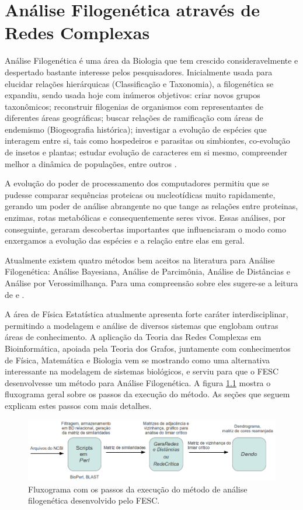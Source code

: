 \chapter{Análise Filogenética através de Redes Complexas} \label{cap:analisefilo}

Análise Filogenética é uma área da Biologia que tem crescido consideravelmente e despertado bastante interesse pelos pesquisadores. Inicialmente usada para
elucidar relações hierárquicas (Classificação e Taxonomia), a filogenética se expandiu, sendo usada hoje com inúmeros objetivos: criar novos grupos
taxonômicos; reconstruir filogenias de organismos com representantes de diferentes áreas geográficas; buscar
relações de ramificação com áreas de endemismo (Biogeografia histórica); investigar a evolução de espécies que interagem entre si, tais como hospedeiros
e parasitas ou simbiontes, co-evolução de insetos e plantas; estudar evolução de caracteres em si mesmo, compreender melhor a dinâmica de populações, entre
outros \cite{schneider2007}.

A evolução do poder de processamento dos computadores
permitiu que se pudesse comparar sequências proteicas ou nucleotídicas muito rapidamente, gerando um poder de análise abrangente no que tange as relações entre
proteinas, enzimas, rotas metabólicas e consequentemente seres vivos. Essas análises, por conseguinte, geraram descobertas importantes que influenciaram o
modo como enxergamos a evolução das espécies e a relação entre elas em geral.

Atualmente existem quatro métodos bem aceitos na literatura para Análise Filogenética: Análise Bayesiana, Análise de Parcimônia,
Análise de Distâncias e Análise por Verossimilhança. Para uma compreensão sobre eles sugere-se a leitura de \cite{marcelo2010} e \cite{schneider2007}.

A área de Física Estatística atualmente apresenta forte caráter interdisciplinar, permitindo a modelagem e análise de diversos sistemas
que englobam outras áreas de conhecimento. A aplicação da Teoria das Redes Complexas em Bioinformática, apoiada pela Teoria dos Grafos,
juntamente com conhecimentos de Física, Matemática e Biologia vem se mostrando como uma alternativa interessante na modelagem de sistemas biológicos,
e serviu para que o FESC desenvolvesse um método para Análise Filogenética. A figura \ref{fig:fluxograma} mostra o fluxograma geral sobre os passos da
execução do método. As seções que seguem explicam estes passos com mais detalhes.

\begin{figure}
\centering
\includegraphics[scale=0.43]{fluxograma}
\caption{Fluxograma com os passos da execução do método de análise filogenética desenvolvido pelo FESC.}
\label{fig:fluxograma}
\end{figure}


